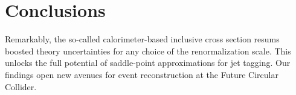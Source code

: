 \section{Conclusions}\label{sec:conclusions}

Remarkably, the so-called calorimeter-based inclusive cross section
resums boosted theory uncertainties for any choice of the
renormalization scale. This unlocks the full potential of saddle-point
approximations for jet tagging. Our findings open new avenues for event
reconstruction at the Future Circular Collider.

